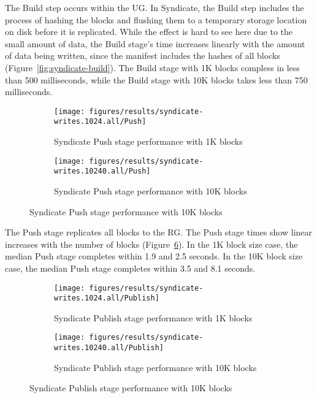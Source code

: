The Build step occurs within the UG.  In Syndicate, the Build step includes the
process of hashing the blocks and flushing them to a temporary storage location on
disk before it is replicated.  While the effect is hard to see here due to the 
small amount of data, the Build stage's time increases linearly with the amount
of data being written, since the manifest includes the hashes of all blocks
(Figure~\ref{fig:syndicate-build}).  The Build stage with 1K blocks compless in
less than 500 milliseconds, while the Build stage with 10K blocks takes less
than 750 milliseconds.

\begin{figure}[htp!]
   \centering
   \caption{Box-and-whiskers plots of the Push stage performance, for 1K and
   10K blocks.}
   \begin{subfigure}[b]{.8\textwidth}
      \texttt{[image: figures/results/syndicate-writes.1024.all/Push]}
      \label{fig:syndicate-push-1k}
      \caption{Syndicate Push stage performance with 1K blocks}
   \end{subfigure}
   \begin{subfigure}[b]{.8\textwidth}
      \texttt{[image: figures/results/syndicate-writes.10240.all/Push]}
      \label{fig:syndicate-push-10k}
      \caption{Syndicate Push stage performance with 10K blocks}
   \end{subfigure}
   \label{fig:syndicate-push}
\end{figure}

The Push stage replicates all blocks to the RG.  The Push stage times show linear
increases with the number of blocks (Figure~\ref{fig:syndicate-push}).
In the 1K block size case, the median Push stage
completes within 1.9 and 2.5 seconds.  In the 10K block size case, the median
Push stage completes within 3.5 and 8.1 seconds.

\begin{figure}[htp!]
   \centering
   \caption{Box-and-whiskers plots of the Publish stage performance, for 1K and
   10K blocks.}
   \begin{subfigure}[b]{.8\textwidth}
      \texttt{[image: figures/results/syndicate-writes.1024.all/Publish]}
      \label{fig:syndicate-publish-1k}
      \caption{Syndicate Publish stage performance with 1K blocks}
   \end{subfigure}
   \begin{subfigure}[b]{.8\textwidth}
      \texttt{[image: figures/results/syndicate-writes.10240.all/Publish]}
      \label{fig:syndicate-publish-10k}
      \caption{Syndicate Publish stage performance with 10K blocks}
   \end{subfigure}
   \label{fig:syndicate-push}
\end{figure}


